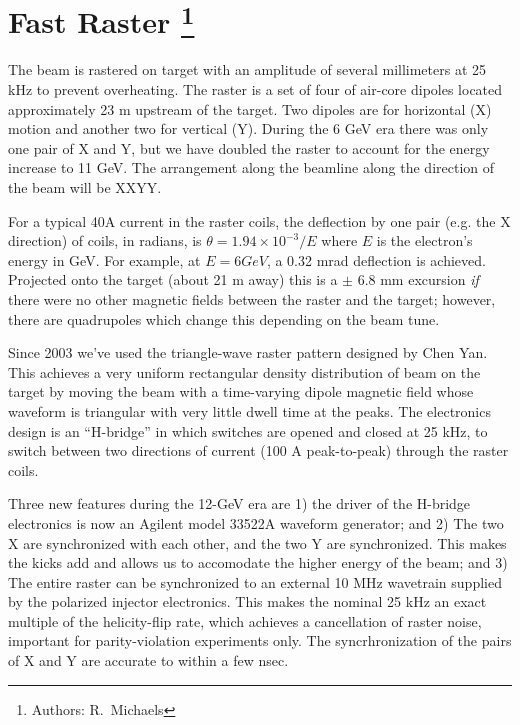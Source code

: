 \section[Fast Raster]{Fast Raster
\footnote{Authors: R.~Michaels }
}


The beam is rastered on target with an amplitude of
several millimeters at 25 kHz to prevent overheating.  
The raster is a set of four of air-core dipoles located
approximately 23 m upstream of the target. 
Two dipoles are for horizontal (X) motion and
another two for vertical (Y).  During the 6 GeV era
there was only one pair of X and Y, but we have doubled
the raster to account for the energy increase to 11 GeV.
The arrangement along the beamline along the 
direction of the beam will be XXYY.

For a typical 40A current in the raster coils, the
deflection by one pair (e.g. the X direction) of coils, 
in radians, is $\theta = 1.94 \times 10^{-3}/ E$
where $E$ is the electron's energy in GeV.
For example, at $E = 6 GeV$, a 0.32 mrad deflection is achieved.
Projected onto the target (about 21 m away) this is a $\pm$ 6.8 mm
excursion {\it if} there were no other magnetic fields 
between the raster and the target; however, there are quadrupoles
which change this depending on the beam tune.

Since 2003 we've used the triangle-wave 
raster pattern designed by Chen Yan.  
This achieves a very uniform rectangular
density distribution of beam on the target 
by moving the beam with a time-varying dipole
magnetic field whose waveform is triangular
with very little dwell time at the peaks.  
The electronics design is an ``H-bridge''
in which switches are opened and closed 
at 25 kHz, to switch between two directions 
of current (100 A peak-to-peak) 
through the raster coils.

Three new features during the 12-GeV era are 
1) the driver of the H-bridge electronics is now
an Agilent model 33522A waveform generator; and
2) The two X are synchronized with each other, and
the two Y are synchronized.  This makes the kicks
add and allows us to accomodate the higher energy
of the beam; and 3) The entire raster can
be synchronized to an external 10 MHz wavetrain
supplied by the polarized injector electronics.
This makes the nominal 25 kHz an exact multiple of
the helicity-flip rate, which achieves a cancellation
of raster noise, important for parity-violation 
experiments only.
The syncrhronization of the pairs of X and Y are
accurate to within a few nsec.

